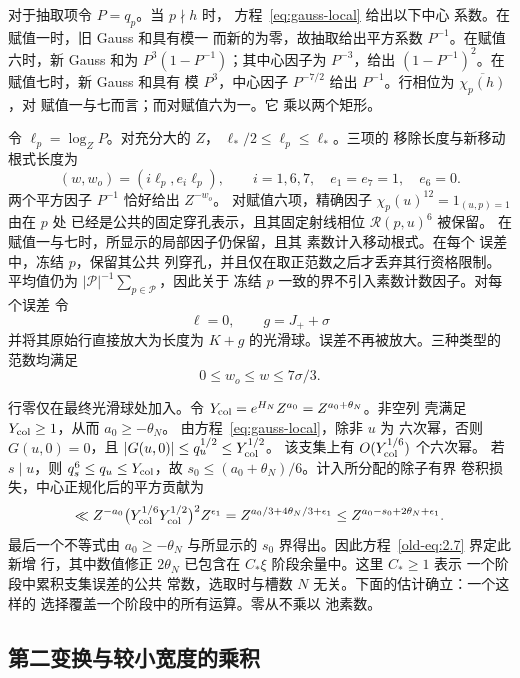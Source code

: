 对于抽取项令 \(P=q_p\)。当 \(p\nmid h\) 时，
方程~\eqref{eq:gauss-local} 给出以下中心
系数。在赋值一时，旧 Gauss 和具有模一
而新的为零，故抽取给出平方系数
\(P^{-1}\)。在赋值六时，新 Gauss 和为
\(P^3(1-P^{-1})\)；其中心因子为 \(P^{-3}\)，给出
\((1-P^{-1})^2\)。在赋值七时，新 Gauss 和具有
模 \(P^3\)，中心因子 \(P^{-7/2}\) 给出
\(P^{-1}\)。行相位为 \(\overline{\chi_p(h)}\)，对
赋值一与七而言；而对赋值六为一。它
乘以两个矩形。

令 \(\ell_p=\log_ZP\)。对充分大的 \(Z\)，
\(\ell_*/2\le\ell_p\le\ell_*\)。三项的
移除长度与新移动根式长度为
\begin{equation}
 (w,w_o)=(i\ell_p,e_i\ell_p),\qquad
 i=1,6,7,\quad e_1=e_7=1,\quad e_6=0.
 \label{old-eq:2.9}
\end{equation}
两个平方因子 \(P^{-1}\) 恰好给出 \(Z^{-w_o}\)。
对赋值六项，精确因子
\(\chi_p(u)^{12}=1_{(u,p)=1}\) 由在 \(p\) 处
已经是公共的固定穿孔表示，且其固定射线相位 \(\mathcal R(p,u)^6\) 被保留。
在赋值一与七时，所显示的局部因子仍保留，且其
素数计入移动根式。在每个
误差中，冻结 \(p\)，保留其公共
列穿孔，并且仅在取正范数之后才丢弃其行资格限制。
平均值仍为
\(|\mathcal P|^{-1}\sum_{p\in\mathcal P}\)，因此关于
冻结 \(p\) 一致的界不引入素数计数因子。对每个误差
令
\[
 \ell=0,\qquad g=J_++\sigma
\]
并将其原始行直接放大为长度为
\(K+g\) 的光滑球。误差不再被放大。三种类型的
范数均满足
\begin{equation}
 0\le w_o\le w\le7\sigma/3.
 \label{old-eq:2.10}
\end{equation}

行零仅在最终光滑球处加入。令
\(Y_{\rm col}=e^{H_N}Z^{a_0}=Z^{a_0+\theta_N}\)。非空列
壳满足 \(Y_{\rm col}\ge1\)，从而 \(a_0\ge-\theta_N\)。
由方程~\eqref{eq:gauss-local}，除非 \(u\) 为
六次幂，否则 \(G(u,0)=0\)，且 \(|G(u,0)|\le q_u^{1/2}\le Y_{\rm col}^{1/2}\)。
该支集上有 \(O(Y_{\rm col}^{1/6})\) 个六次幂。
若 \(s\mid u\)，则 \(q_s^6\le q_u\le Y_{\rm col}\)，故
\(s_0\le(a_0+\theta_N)/6\)。计入所分配的除子有界
卷积损失，中心正规化后的平方贡献为
\[
 \ll Z^{-a_0}\bigl(Y_{\rm col}^{1/6}Y_{\rm col}^{1/2}\bigr)^2
          Z^{\epsilon_1}
 =Z^{a_0/3+4\theta_N/3+\epsilon_1}
 \le Z^{a_0-s_0+2\theta_N+\epsilon_1}.
\]
最后一个不等式由 \(a_0\ge-\theta_N\) 与所显示的
\(s_0\) 界得出。因此方程~\eqref{old-eq:2.7} 界定此新增
行，其中数值修正 \(2\theta_N\) 已包含在
\(C_*\xi\) 阶段余量中。这里 \(C_*\ge1\) 表示
一个阶段中累积支集误差的公共
常数，选取时与槽数 \(N\) 无关。下面的估计确立：一个这样的
选择覆盖一个阶段中的所有运算。零从不乘以
池素数。

\subsection{第二变换与较小宽度的乘积}\label{sec:plain-second-transform}

